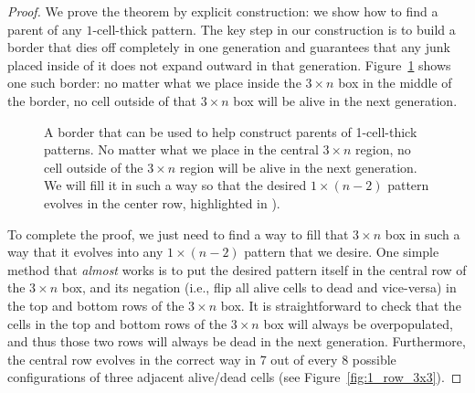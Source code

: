 \begin{proof}
	We prove the theorem by explicit construction: we show how to find a parent of any $1$-cell-thick pattern. The key step in our construction is to build a border that dies off completely in one generation and guarantees that any junk placed inside of it does not expand outward in that generation. Figure~\ref{fig:1_row_border} shows one such border: no matter what we place inside the $3 \times n$ box in the middle of the border, no cell outside of that $3 \times n$ box will be alive in the next generation.
	
	\begin{figure}[!htb]
		\centering{}
		\caption{A border that can be used to help construct parents of 1-cell-thick patterns. No matter what we place in the central $3 \times n$ region, no cell outside of the $3 \times n$ region will be alive in the next generation. We will fill it in such a way so that the desired $1 \times (n-2)$ pattern evolves in the center row, highlighted in ).}\label{fig:1_row_border}
	\end{figure}
	
	To complete the proof, we just need to find a way to fill that $3 \times n$ box in such a way that it evolves into any $1 \times (n-2)$ pattern that we desire. One simple method that \emph{almost} works is to put the desired pattern itself in the central row of the $3 \times n$ box, and its negation (i.e., flip all alive cells to dead and vice-versa) in the top and bottom rows of the $3 \times n$ box. It is straightforward to check that the cells in the top and bottom rows of the $3 \times n$ box will always be overpopulated, and thus those two rows will always be dead in the next generation. Furthermore, the central row evolves in the correct way in 7 out of every 8 possible configurations of three adjacent alive/dead cells (see Figure~\ref{fig:1_row_3x3}).
	

\end{proof}

